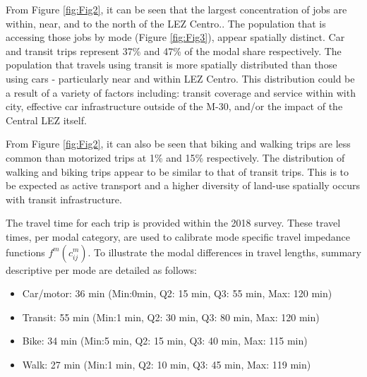 \documentclass[numbered]{trbunofficial}
\providecommand{\tightlist}{%
  \setlength{\itemsep}{0pt}\setlength{\parskip}{0pt}}
\begin{document}
From Figure \ref{fig:Fig2}, it can be seen that the largest
concentration of jobs are within, near, and to the north of the LEZ
Centro.. The population that is accessing those jobs by mode (Figure
\ref{fig:Fig3}), appear spatially distinct. Car and transit trips
represent 37\% and 47\% of the modal share respectively. The population
that travels using transit is more spatially distributed than those
using cars - particularly near and within LEZ Centro. This distribution
could be a result of a variety of factors including: transit coverage
and service within with city, effective car infrastructure outside of
the M-30, and/or the impact of the Central LEZ itself.

From Figure \ref{fig:Fig2}, it can also be seen that biking and walking
trips are less common than motorized trips at 1\% and 15\% respectively.
The distribution of walking and biking trips appear to be similar to
that of transit trips. This is to be expected as active transport and a
higher diversity of land-use spatially occurs with transit
infrastructure.

The travel time for each trip is provided within the 2018 survey. These
travel times, per modal category, are used to calibrate mode specific
travel impedance functions \(f^m(c_{ij}^m)\). To illustrate the modal
differences in travel lengths, summary descriptive per mode are detailed
as follows:

\begin{itemize}
\tightlist
\item
  Car/motor: 36 min (Min:0min, Q2: 15 min, Q3: 55 min, Max: 120 min)
\item
  Transit: 55 min (Min:1 min, Q2: 30 min, Q3: 80 min, Max: 120 min)
\item
  Bike: 34 min (Min:5 min, Q2: 15 min, Q3: 40 min, Max: 115 min)
\item
  Walk: 27 min (Min:1 min, Q2: 10 min, Q3: 45 min, Max: 119 min)
\end{itemize}
\end{document}
